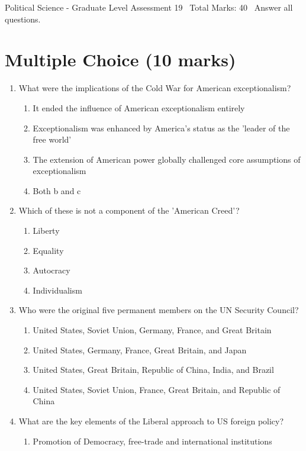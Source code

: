 \documentclass[12pt]{article}
\begin{document}
\begin{center}
Political Science - Graduate Level Assessment 19 \
Total Marks: 40 \
Answer all questions.
\end{center}

\section*{Multiple Choice (10 marks)}
\begin{enumerate}[label=\arabic*.]
\item What were the implications of the Cold War for American exceptionalism?
\begin{enumerate}[label=(\alph*)]
    \item It ended the influence of American exceptionalism entirely
    \item Exceptionalism was enhanced by America's status as the 'leader of the free world'
    \item The extension of American power globally challenged core assumptions of exceptionalism
    \item Both b and c
\end{enumerate}
\item Which of these is not a component of the 'American Creed'?
\begin{enumerate}[label=(\alph*)]
    \item Liberty
    \item Equality
    \item Autocracy
    \item Individualism
\end{enumerate}
\item Who were the original five permanent members on the UN Security Council?
\begin{enumerate}[label=(\alph*)]
    \item United States, Soviet Union, Germany, France, and Great Britain
    \item United States, Germany, France, Great Britain, and Japan
    \item United States, Great Britain, Republic of China, India, and Brazil
    \item United States, Soviet Union, France, Great Britain, and Republic of China
\end{enumerate}
\item What are the key elements of the Liberal approach to US foreign policy?
\begin{enumerate}[label=(\alph*)]
    \item Promotion of Democracy, free-trade and international institutions

\end{enumerate}
\end{enumerate}
\end{document}
